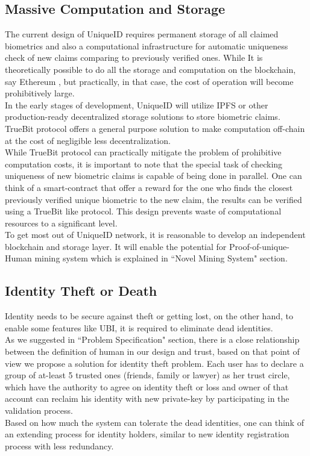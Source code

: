 \documentclass[conference]{IEEEtran}
\begin{document}
\subsection{Massive Computation and Storage}
The current design of UniqueID requires permanent storage of all claimed biometrics and also a computational infrastructure for automatic uniqueness check of new claims comparing to previously verified ones. While It is theoretically possible to do all the storage and computation on the blockchain, say Ethereum \cite{ethereum}, but practically, in that case, the cost of operation will become prohibitively large. \\
In the early stages of development, UniqueID will utilize IPFS or other production-ready decentralized storage solutions to store biometric claims. TrueBit protocol offers a general purpose solution to make computation off-chain at the cost of negligible less decentralization. \\
While TrueBit protocol can practically mitigate the problem of prohibitive computation costs, it is important to note that the special task of checking uniqueness of new biometric claims is capable of being done in parallel. One can think of a smart-contract that offer a reward for the one who finds the closest previously verified unique biometric to the new claim, the results can be verified using a TrueBit like protocol. This design prevents waste of computational resources to a significant level.\\
To get most out of UniqueID network, it is reasonable to develop an independent blockchain and storage layer. It will enable the potential for Proof-of-unique-Human mining system which is explained in ``Novel Mining System" section. 
\subsection{Identity Theft or Death}
Identity needs to be secure against theft or getting lost, on the other hand, to enable some features like UBI, it is required to eliminate dead identities.\\
As we suggested in ``Problem Specification" section, there is a close relationship between the definition of human in our design and trust, based on that point of view we propose a solution for identity theft problem. Each user has to declare a group of at-least 5 trusted ones (friends, family or lawyer) as her trust circle, which have the authority to agree on identity theft or loss and owner of that account can reclaim his identity with new private-key by participating in the validation process.\\
Based on how much the system can tolerate the dead identities, one can think of an extending process for identity holders, similar to new identity registration process with less redundancy.
\end{document}
